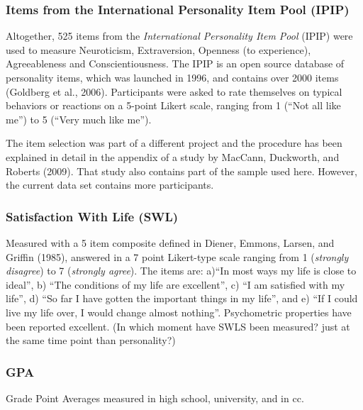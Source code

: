 \documentclass[,man,floatsintext]{apa6}
\theoremstyle{definition}
\theoremstyle{definition}
\theoremstyle{definition}
\theoremstyle{remark}
\begin{document}
\hypertarget{items-from-the-international-personality-item-pool-ipip}{%
\subsubsection{Items from the International Personality Item Pool
(IPIP)}\label{items-from-the-international-personality-item-pool-ipip}}

Altogether, 525 items from the \emph{International Personality Item
Pool} (IPIP) were used to measure Neuroticism, Extraversion, Openness
(to experience), Agreeableness and Conscientiousness. The IPIP is an
open source database of personality items, which was launched in 1996,
and contains over 2000 items (Goldberg et al., 2006). Participants were
asked to rate themselves on typical behaviors or reactions on a 5-point
Likert scale, ranging from 1 (\enquote{Not all like me}) to 5
(\enquote{Very much like me}).

The item selection was part of a different project and the procedure has
been explained in detail in the appendix of a study by MacCann,
Duckworth, and Roberts (2009). That study also contains part of the
sample used here. However, the current data set contains more
participants.

\hypertarget{satisfaction-with-life-swl}{%
\subsubsection{Satisfaction With Life
(SWL)}\label{satisfaction-with-life-swl}}

Measured with a 5 item composite defined in Diener, Emmons, Larsen, and
Griffin (1985), answered in a 7 point Likert-type scale ranging from 1
(\emph{strongly disagree}) to 7 (\emph{strongly agree}). The items are:
a)\enquote{In most ways my life is close to ideal}, b) \enquote{The
conditions of my life are excellent}, c) \enquote{I am satisfied with my
life}, d) \enquote{So far I have gotten the important things in my
life}, and e) \enquote{If I could live my life over, I would change
almost nothing}. Psychometric properties have been reported excellent.
(In which moment have SWLS been measured? just at the same time point
than personality?)

\hypertarget{gpa}{%
\subsubsection{GPA}\label{gpa}}

Grade Point Averages measured in high school, university, and in cc.
\end{document}
